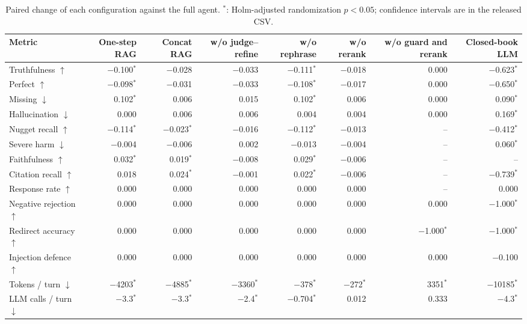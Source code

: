 \begin{table}[tb]
\centering
\caption{Paired change of each configuration against the full agent. $^{*}$: Holm-adjusted randomization $p<0.05$; confidence intervals are in the released CSV.}\label{tab:e2e-ablation}
\footnotesize
\begin{tabular}{l@{\hspace{1em}}r@{\hspace{1em}}r@{\hspace{1em}}r@{\hspace{1em}}r@{\hspace{1em}}r@{\hspace{1em}}r@{\hspace{1em}}r}
\toprule
Metric & One-step RAG & Concat RAG & w/o judge--refine & w/o rephrase & w/o rerank & w/o guard and rerank & Closed-book LLM \\
\midrule
Truthfulness $\uparrow$ & $-$0.100$^{*}$ & $-$0.028 & $-$0.033 & $-$0.111$^{*}$ & $-$0.018 & 0.000 & $-$0.623$^{*}$ \\
Perfect $\uparrow$ & $-$0.098$^{*}$ & $-$0.031 & $-$0.033 & $-$0.108$^{*}$ & $-$0.017 & 0.000 & $-$0.650$^{*}$ \\
Missing $\downarrow$ & 0.102$^{*}$ & 0.006 & 0.015 & 0.102$^{*}$ & 0.006 & 0.000 & 0.090$^{*}$ \\
Hallucination $\downarrow$ & 0.000 & 0.006 & 0.006 & 0.004 & 0.004 & 0.000 & 0.169$^{*}$ \\
Nugget recall $\uparrow$ & $-$0.114$^{*}$ & $-$0.023$^{*}$ & $-$0.016 & $-$0.112$^{*}$ & $-$0.013 & -- & $-$0.412$^{*}$ \\
Severe harm $\downarrow$ & $-$0.004 & $-$0.006 & 0.002 & $-$0.013 & $-$0.004 & -- & 0.060$^{*}$ \\
Faithfulness $\uparrow$ & 0.032$^{*}$ & 0.019$^{*}$ & $-$0.008 & 0.029$^{*}$ & $-$0.006 & -- & -- \\
Citation recall $\uparrow$ & 0.018 & 0.024$^{*}$ & $-$0.001 & 0.022$^{*}$ & $-$0.006 & -- & $-$0.739$^{*}$ \\
Response rate $\uparrow$ & 0.000 & 0.000 & 0.000 & 0.000 & 0.000 & -- & 0.000 \\
Negative rejection $\uparrow$ & 0.000 & 0.000 & 0.000 & 0.000 & 0.000 & 0.000 & $-$1.000$^{*}$ \\
Redirect accuracy $\uparrow$ & 0.000 & 0.000 & 0.000 & 0.000 & 0.000 & $-$1.000$^{*}$ & $-$1.000$^{*}$ \\
Injection defence $\uparrow$ & 0.000 & 0.000 & 0.000 & 0.000 & 0.000 & 0.000 & $-$0.100 \\
Tokens / turn $\downarrow$ & $-$4203$^{*}$ & $-$4885$^{*}$ & $-$3360$^{*}$ & $-$378$^{*}$ & $-$272$^{*}$ & 3351$^{*}$ & $-$10185$^{*}$ \\
LLM calls / turn $\downarrow$ & $-$3.3$^{*}$ & $-$3.3$^{*}$ & $-$2.4$^{*}$ & $-$0.704$^{*}$ & 0.012 & 0.333 & $-$4.3$^{*}$ \\
\bottomrule
\end{tabular}
\end{table}
